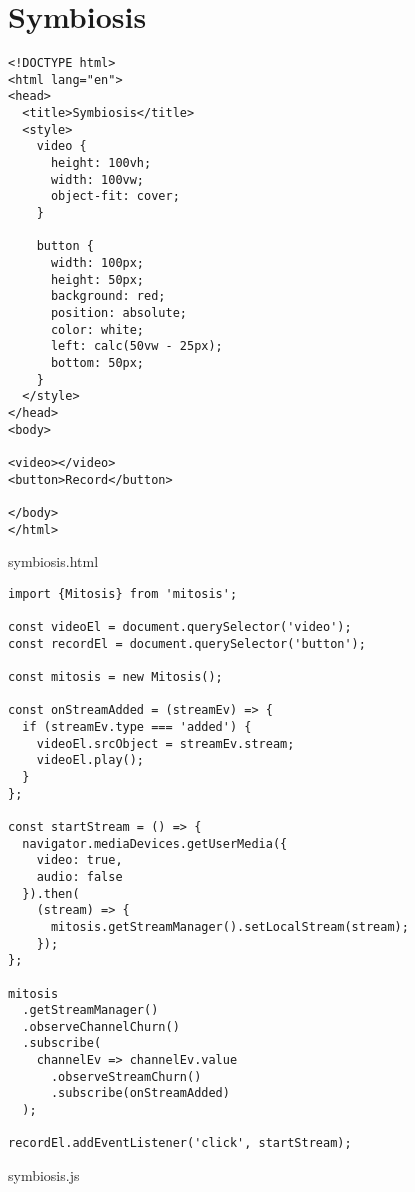 \section{Symbiosis}\label{sec:symbiosis-soruce-code}

\begin{Listing}[H]
\begin{lstlisting}[xleftmargin=3em]
<!DOCTYPE html>
<html lang="en">
<head>
  <title>Symbiosis</title>
  <style>
    video {
      height: 100vh;
      width: 100vw;
      object-fit: cover;
    }

    button {
      width: 100px;
      height: 50px;
      background: red;
      position: absolute;
      color: white;
      left: calc(50vw - 25px);
      bottom: 50px;
    }
  </style>
</head>
<body>

<video></video>
<button>Record</button>

</body>
</html>
\end{lstlisting}
\caption{symbiosis.html}
\label{lst:symbiosis-html}
\end{Listing}

\begin{Listing}[H]
\begin{lstlisting}[xleftmargin=3em]
import {Mitosis} from 'mitosis';

const videoEl = document.querySelector('video');
const recordEl = document.querySelector('button');

const mitosis = new Mitosis();

const onStreamAdded = (streamEv) => {
  if (streamEv.type === 'added') {
    videoEl.srcObject = streamEv.stream;
    videoEl.play();
  }
};

const startStream = () => {
  navigator.mediaDevices.getUserMedia({
    video: true,
    audio: false
  }).then(
    (stream) => {
      mitosis.getStreamManager().setLocalStream(stream);
    });
};

mitosis
  .getStreamManager()
  .observeChannelChurn()
  .subscribe(
    channelEv => channelEv.value
      .observeStreamChurn()
      .subscribe(onStreamAdded)
  );

recordEl.addEventListener('click', startStream);
\end{lstlisting}
\caption{symbiosis.js}
\label{lst:symbiosis-js}
\end{Listing}